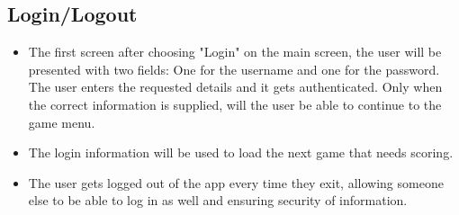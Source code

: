 \documentclass[hidelinks,a4paper,12pt]{article}
\begin{document}
	\subsection{Login/Logout}
		\begin {itemize}
			\item The first screen after choosing "Login" on the main screen, the user will be presented with two fields: One for the username and one for the password. The user enters the requested details and it gets authenticated. Only when the correct information is supplied, will the user be able to continue to the game menu.
			\item The login information will be used to load the next game that needs scoring.
			\item The user gets logged out of the app every time they exit, allowing someone else to be able to log in as well and ensuring security of information.
		\end{itemize}
		
\end{document}
